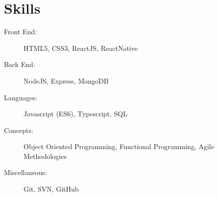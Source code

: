 \documentclass[a4paper,10pt]{article}
\begin{document}

\fancyhead[C]{
}




\section{Skills}

\begin{description}
    \item[Front End:] HTML5, CSS3, ReactJS, ReactNative
    \item[Back End:] NodeJS, Express, MongoDB
    \item[Languages:] Javascript (ES6), Typescript, SQL
    \item[Concepts:] Object Oriented Programming, Functional Programming, Agile Methodologies
    \item[Miscellaneous:] Git, SVN, GitHub
\end{description}
\end{document}
